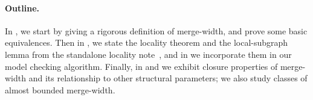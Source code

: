 \documentclass[11pt]{article}
\renewenvironment{leftbar}[1][blue]
{%
\def\FrameCommand
{%
{\hspace{-8pt} \color{#1} \vrule width 3pt}%
\hspace{0pt}%
\fboxsep=\FrameSep\colorbox{#1!5!}%
}%
\MakeFramed{\hsize\hsize\advance\hsize-\width\FrameRestore}%
}
{\endMakeFramed}
\newtheorem{theorem}{Theorem}[section]
\theoremstyle{remark}
\newcommand{\from}{\colon}
\def\phi{\varphi}
\def\N{\mathbb N}
\renewcommand{\le}{\leqslant}
\begin{document}
 \paragraph{Outline.}
 In , we start by giving a rigorous definition of merge-width, and prove some basic equivalences.
 Then in , we state the locality theorem and the local-subgraph lemma from the standalone locality note~\cite{locality-note}, and in  we incorporate them in our model checking algorithm.
 Finally, in  and  we exhibit closure properties of merge-width and its relationship
 to other structural parameters; we also study classes of almost bounded merge-width.











\end{document}
